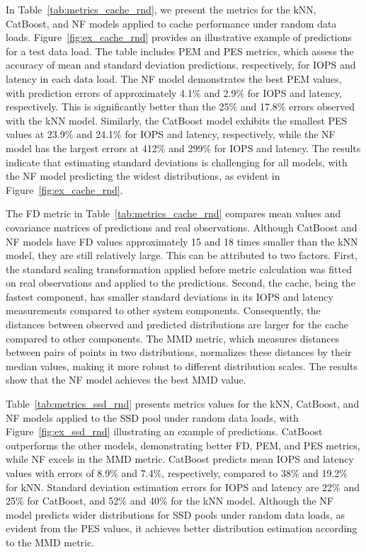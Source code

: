 In Table~\ref{tab:metrics_cache_rnd}, we present the metrics for the kNN, CatBoost, and NF models applied to cache performance under random data loads. Figure~\ref{fig:ex_cache_rnd} provides an illustrative example of predictions for a test data load. The table includes PEM and PES metrics, which assess the accuracy of mean and standard deviation predictions, respectively, for IOPS and latency in each data load. The NF model demonstrates the best PEM values, with prediction errors of approximately 4.1\% and 2.9\% for IOPS and latency, respectively. This is significantly better than the 25\% and 17.8\% errors observed with the kNN model. Similarly, the CatBoost model exhibits the smallest PES values at 23.9\% and 24.1\% for IOPS and latency, respectively, while the NF model has the largest errors at 412\% and 299\% for IOPS and latency. The results indicate that estimating standard deviations is challenging for all models, with the NF model predicting the widest distributions, as evident in Figure~\ref{fig:ex_cache_rnd}.

The FD metric in Table~\ref{tab:metrics_cache_rnd} compares mean values and covariance matrices of predictions and real observations. Although CatBoost and NF models have FD values approximately 15 and 18 times smaller than the kNN model, they are still relatively large. This can be attributed to two factors. First, the standard scaling transformation applied before metric calculation was fitted on real observations and applied to the predictions. Second, the cache, being the fastest component, has smaller standard deviations in its IOPS and latency measurements compared to other system components. Consequently, the distances between observed and predicted distributions are larger for the cache compared to other components. The MMD metric, which measures distances between pairs of points in two distributions, normalizes these distances by their median values, making it more robust to different distribution scales. The results show that the NF model achieves the best MMD value.

Table~\ref{tab:metrics_ssd_rnd} presents metrics values for the kNN, CatBoost, and NF models applied to the SSD pool under random data loads, with Figure~\ref{fig:ex_ssd_rnd} illustrating an example of predictions. CatBoost outperforms the other models, demonstrating better FD, PEM, and PES metrics, while NF excels in the MMD metric. CatBoost predicts mean IOPS and latency values with errors of 8.9\% and 7.4\%, respectively, compared to 38\% and 19.2\% for kNN. Standard deviation estimation errors for IOPS and latency are 22\% and 25\% for CatBoost, and 52\% and 40\% for the kNN model. Although the NF model predicts wider distributions for SSD pools under random data loads, as evident from the PES values, it achieves better distribution estimation according to the MMD metric.

